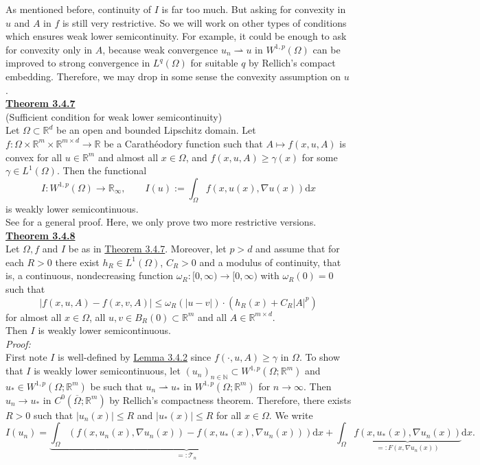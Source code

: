 As mentioned before, continuity of $I$ is far too much. But asking for convexity in $u$ and $A$ in $f$ is still very restrictive. So we will work on other types of conditions which ensures weak lower semicontinuity. For example, it could be enough to ask for convexity only in $A$, because weak convergence $u_n\rightharpoonup u$ in $W^{1,p}(\Omega)$ can be improved to strong convergence in $L^q(\Omega)$ for suitable $q$ by Rellich's compact embedding. Therefore, we may drop in some sense the convexity assumption on $u$.\\[11pt]

\hypertarget{theorem_3_4_7}{\textbf{\underline{Theorem 3.4.7}}}\\
(Sufficient condition for weak lower semicontinuity)\\
Let $\Omega\subset\mathbb{R}^d$ be an open and bounded Lipschitz domain. Let $f:\Omega\times\mathbb{R}^m\times\mathbb{R}^{m\times d}\longrightarrow\mathbb{R}$ be a Carath\'eodory function such that $A\longmapsto f(x,u,A)$ is convex for all $u\in\mathbb{R}^m$ and almost all $x\in\Omega$, and $f(x,u,A)\geq\gamma(x)$ for some $\gamma\in L^1(\Omega)$. Then the functional
\[I:W^{1,p}(\Omega)\longrightarrow\mathbb{R}_\infty,\qquad I(u):=\int_\Omega{f(x,u(x),\nabla u(x))\mathrm{d}x}\]
is weakly lower semicontinuous.\\

See \cite[Theorem 3.23]{bernard_dacorogna_direct} for a general proof. Here, we only prove two more restrictive versions.\\[11pt]

\hypertarget{theorem_3_4_8}{\textbf{\underline{Theorem 3.4.8}}}\\
Let $\Omega,f$ and $I$ be as in \hyperlink{theorem_3_4_7}{Theorem 3.4.7}. Moreover, let $p>d$ and assume that for each $R>0$ there exist $h_R\in L^1(\Omega)$, $C_R>0$ and a modulus of continuity, that is, a continuous, nondecreasing function $\omega_R:[0,\infty)\longrightarrow[0,\infty)$ with $\omega_R(0)=0$ such that
\[\lvert f(x,u,A)-f(x,v,A)\rvert\leq\omega_R(\lvert u-v\rvert)\cdot\left(h_R(x)+C_R\lvert A\rvert^p\right)\]
for almost all $x\in\Omega$, all $u,v\in B_R(0)\subset\mathbb{R}^m$ and all $A\in\mathbb{R}^{m\times d}$.\\

Then $I$ is weakly lower semicontinuous.\\

\textit{Proof:}\\
First note $I$ is well-defined by \hyperlink{lemma_3_4_2}{Lemma 3.4.2} since $f(\cdot,u,A)\geq\gamma$ in $\Omega$. To show that $I$ is weakly lower semicontinuous, let $(u_n)_{n\in\mathbb{N}}\subset W^{1,p}(\Omega;\mathbb{R}^m)$ and $u_*\in W^{1,p}(\Omega;\mathbb{R}^m)$ be such that $u_n\rightharpoonup u_*$ in $W^{1,p}(\Omega;\mathbb{R}^m)$ for $n\to\infty$. Then $u_n\to u_*$ in $C^0(\overline{\Omega};\mathbb{R}^m)$ by Rellich's compactness theorem. Therefore, there exists $R>0$ such that $\lvert u_n(x)\rvert\leq R$ and $\lvert u_*(x)\rvert\leq R$ for all $x\in\Omega$. We write
\[I(u_n)=\underbrace{\int_\Omega{(f(x,u_n(x),\nabla u_n(x))-f(x,u_*(x),\nabla u_n(x)))\mathrm{d}x}}_{=:\mathcal{T}_n}+\int_\Omega{\underbrace{f(x,u_*(x),\nabla u_n(x))}_{=:F(x,\nabla u_n(x))}\mathrm{d}x}.\]

